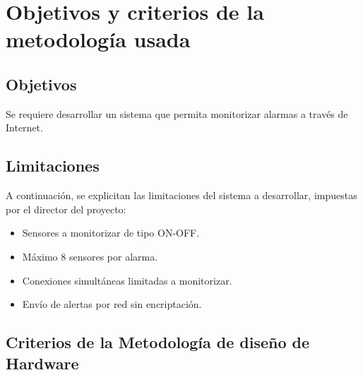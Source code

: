 
\chapter{Objetivos y criterios de la metodología usada} %

\label{Chapter2} %



\section{Objetivos}

Se requiere desarrollar un sistema que permita monitorizar alarmas a través de Internet.


\section{Limitaciones}

A continuación, se explicitan las limitaciones del sistema a desarrollar, impuestas por el director del proyecto:
\begin{itemize}
\item Sensores a monitorizar de tipo ON-OFF.
\item Máximo 8 sensores por alarma.
\item Conexiones simultáneas limitadas a monitorizar.
\item Envío de alertas por red sin encriptación.
\end{itemize}

\clearpage

\section{Criterios de la Metodología de diseño de Hardware}

